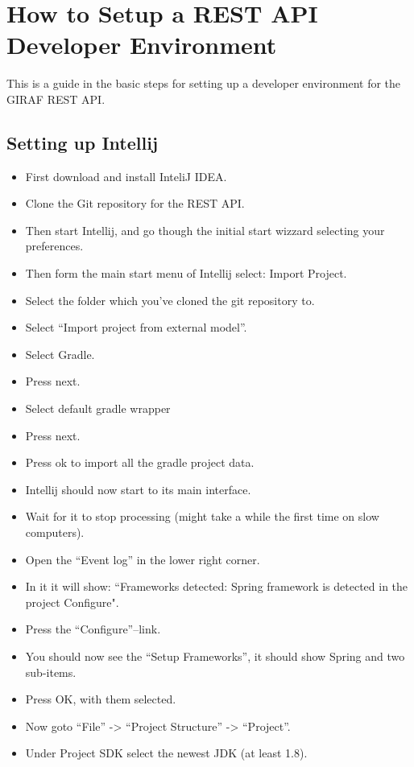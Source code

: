 \chapter{How to Setup a REST API Developer Environment}\label{app:restdevenv}
This is a guide in the basic steps for setting up a developer environment for the GIRAF REST API.

\section{Setting up Intellij}
\begin{itemize}
    \item First download and install InteliJ IDEA.
    \item Clone the Git repository for the REST API.
    \item Then start Intellij, and go though the initial start wizzard selecting your preferences.
    \item Then form the main start menu of Intellij select: Import Project.
    \item Select the folder which you've cloned the git repository to.
    \item Select ``Import project from external model''.
    \item Select Gradle.
    \item Press next.
    \item Select default gradle wrapper
    \item Press next.
    \item Press ok to import all the gradle project data.
    \item Intellij should now start to its main interface.
    \item Wait for it to stop processing (might take a while the first time on slow computers).
    \item Open the ``Event log'' in the lower right corner.
    \item In it it will show: ``Frameworks detected: Spring framework is detected in the project Configure".
    \item Press the ``Configure''--link.
    \item You should now see the ``Setup Frameworks'', it should show Spring and two sub-items.
    \item Press OK, with them selected.
    \item Now goto ``File'' -> ``Project Structure'' -> ``Project''.
    \item Under Project SDK select the newest JDK (at least 1.8).

\end{itemize}
